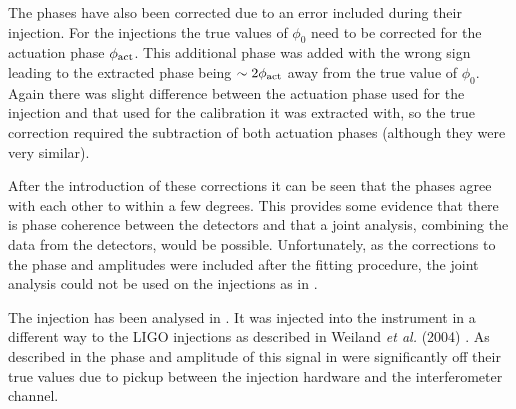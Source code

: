 The phases have also been corrected due to an error included during their injection. For the
injections the true values of $\phi_0$ need to be corrected for the actuation phase $\phi_{\rm
act}$. This additional phase was added with the wrong sign leading to the extracted phase being
$\sim 2\phi_{\rm act}$ away from the true value of $\phi_0$. Again there was slight difference
between the actuation phase used for the injection and that used for the calibration it was
extracted with, so the true correction required the subtraction of both actuation phases (although
they were very similar).

After the introduction of these corrections it can be seen that the phases agree with each other to
within a few degrees. This provides some evidence that there is phase coherence between the
detectors and that a joint analysis, combining the data from the detectors, would be possible.
Unfortunately, as the corrections to the phase and amplitudes were included after the fitting
procedure, the joint analysis could not be used on the injections as in \cite{Abbott:2005}.

The \geo injection has been analysed in \cite{Dupuis:2004}. It was injected into the instrument in
a different way to the LIGO injections as described in Weiland {\it et al.} (2004)
\cite{Weiland:2004}. As described in \cite{Dupuis:2004} the phase and amplitude of this signal in
\geo were significantly off their true values due to pickup between the injection hardware and the
interferometer \gw channel.

